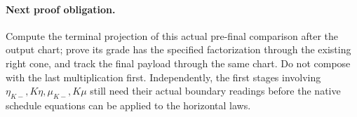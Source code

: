 \documentclass[10pt]{article}
\begin{document}
\paragraph{Next proof obligation.} Compute the terminal projection of this actual pre-final comparison after the output chart; prove its grade has the specified factorization through the existing right cone, and track the final payload through the same chart. Do not compose with the last multiplication first. Independently, the first stages involving $\eta_{K-},K\eta,\mu_{K-},K\mu$ still need their actual boundary readings before the native schedule equations can be applied to the horizontal laws.
\end{document}
